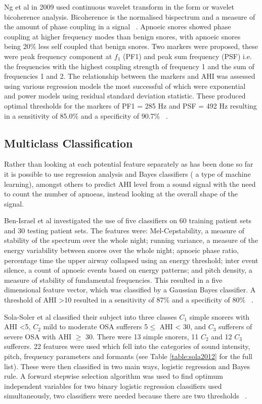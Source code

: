 Ng et al in 2009 used continuous wavelet transform in the form or wavelet bicoherence analysis. Bicoherence is the normalised bispectrum and a measure of the amount of phase coupling in a signal ~\cite{van1995wavelet}. Apnoeic snores showed phase coupling at higher frequency modes than benign snores, with apnoeic snores being 20\% less self coupled that benign snores. Two markers were proposed, these were peak frequency component at $f_1$ (PF1) and peak sum frequency (PSF) i.e. the frequencies with the highest coupling strength of frequency 1 and the sum of frequencies 1 and 2. The relationship between the markers and AHI was assessed using various regression models the most successful of which were exponential and power models using residual standard deviation statistic. These produced optimal thresholds for the markers of PF1 = 285 Hz and PSF = 492 Hz resulting in a sensitivity of 85.0\% and a specificity of 90.7\% ~\cite{ng2009investigation}.

\subsection{Multiclass Classification}
Rather than looking at each potential feature separately as has been done so far it is possible to use regression analysis and Bayes classifiers ( a type of machine learning), amongst others to predict AHI level from a sound signal with the need to count the number of apnoeas, instead looking at the overall shape of the signal.

Ben-Israel et al investigated the use of five classifiers on 60 training patient sets and 30 testing patient sets. The features were: Mel-Cepstability, a measure of stability of the spectrum over the whole night; running variance, a measure of the energy variability between snores over the whole night; apnoeic phase ratio, percentage time the upper airway collapsed using an energy threshold; inter event silence, a count of apnoeic events based on energy patterns; and pitch density, a measure of stability of fundamental frequencies. This resulted in a five dimensional feature vector, which was classified by a Gaussian Bayes classifier. A threshold of AHI >10 resulted in a sensitivity of 87\% and a specificity of 80\% ~\cite{ben2012obstructive}.

Sola-Soler et al classified their subject into three classes $C_{1}$ simple snorers with AHI <5, $C_{2}$ mild to moderate OSA sufferers 5$\leq$ AHI < 30, and $C_{3}$ sufferers of severe OSA with AHI $\geq$ 30. There were 13 simple snorers, 11 $C_{2}$ and 12 $C_{3}$ sufferers. 22 features were used which fell into the categories of sound intensity, pitch, frequency parameters and formants (see Table \ref{table:sola2012} for the full list). These were then classified in two main ways, logistic regression and Bayes rule. A forward stepwise selection algorithm was used to find optimum independent variables for two binary logistic regression classifiers used simultaneously, two classifiers were needed because there are two thresholds ~\cite{sola2012multiclass}.


